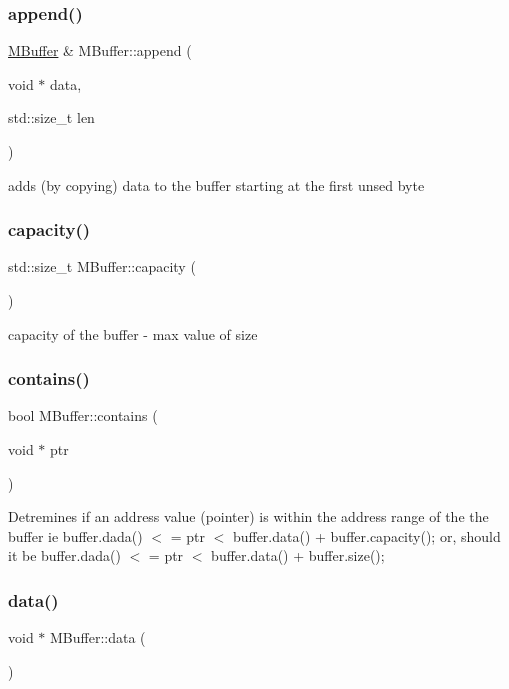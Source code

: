 \subsubsection{\texorpdfstring{append()}{append()}}
{\footnotesize\ttfamily \hyperlink{struct_m_buffer}{M\+Buffer} \& M\+Buffer\+::append (\begin{DoxyParamCaption}\item[{void $\ast$}]{data,  }\item[{std\+::size\+\_\+t}]{len }\end{DoxyParamCaption})}

adds (by copying) data to the buffer starting at the first unsed byte \mbox{\label{struct_m_buffer_acadde0f7cb85b05602a61aa8e3277369}} 
\subsubsection{\texorpdfstring{capacity()}{capacity()}}
{\footnotesize\ttfamily std\+::size\+\_\+t M\+Buffer\+::capacity (\begin{DoxyParamCaption}{ }\end{DoxyParamCaption})}

capacity of the buffer -\/ max value of size \mbox{\label{struct_m_buffer_a629f84798448ae301df28d3d54520135}} 
\subsubsection{\texorpdfstring{contains()}{contains()}}
{\footnotesize\ttfamily bool M\+Buffer\+::contains (\begin{DoxyParamCaption}\item[{void $\ast$}]{ptr }\end{DoxyParamCaption})}

Detremines if an address value (pointer) is within the address range of the the buffer ie buffer.\+dada() $<$ = ptr $<$ buffer.\+data() + buffer.\+capacity(); or, should it be buffer.\+dada() $<$ = ptr $<$ buffer.\+data() + buffer.\+size(); \mbox{\label{struct_m_buffer_a76fda1089c0abb54ac72977228245725}} 
\subsubsection{\texorpdfstring{data()}{data()}}
{\footnotesize\ttfamily void $\ast$ M\+Buffer\+::data (\begin{DoxyParamCaption}{ }\end{DoxyParamCaption})}

